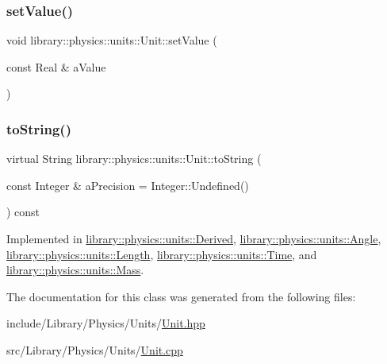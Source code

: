 \mbox{\label{classlibrary_1_1physics_1_1units_1_1_unit_a0d61125a36ae706eb4800564fb7c5e54}} 
\subsubsection{\texorpdfstring{set\+Value()}{setValue()}}
{\footnotesize\ttfamily void library\+::physics\+::units\+::\+Unit\+::set\+Value (\begin{DoxyParamCaption}\item[{const Real \&}]{a\+Value }\end{DoxyParamCaption})}

\mbox{\label{classlibrary_1_1physics_1_1units_1_1_unit_ad7364d457300e36413323c4aebce8029}} 
\subsubsection{\texorpdfstring{to\+String()}{toString()}}
{\footnotesize\ttfamily virtual String library\+::physics\+::units\+::\+Unit\+::to\+String (\begin{DoxyParamCaption}\item[{const Integer \&}]{a\+Precision = {\ttfamily Integer\+:\+:Undefined()} }\end{DoxyParamCaption}) const\hspace{0.3cm}{\ttfamily [pure virtual]}}



Implemented in \hyperlink{classlibrary_1_1physics_1_1units_1_1_derived_a3626d6c77e6753f44232067856fde9d1}{library\+::physics\+::units\+::\+Derived}, \hyperlink{classlibrary_1_1physics_1_1units_1_1_angle_aae6b7bd4e028ea7719f5a712ca19a86c}{library\+::physics\+::units\+::\+Angle}, \hyperlink{classlibrary_1_1physics_1_1units_1_1_length_aea1d96e6930f7e6e6383e78c55219a64}{library\+::physics\+::units\+::\+Length}, \hyperlink{classlibrary_1_1physics_1_1units_1_1_time_a6f56977493a45d334bb53bc4246888c4}{library\+::physics\+::units\+::\+Time}, and \hyperlink{classlibrary_1_1physics_1_1units_1_1_mass_a6e7757920752ac9f6918525d6fadb31e}{library\+::physics\+::units\+::\+Mass}.



The documentation for this class was generated from the following files\+:\begin{DoxyCompactItemize}
\item 
include/\+Library/\+Physics/\+Units/\hyperlink{_units_2_unit_8hpp}{Unit.\+hpp}\item 
src/\+Library/\+Physics/\+Units/\hyperlink{_units_2_unit_8cpp}{Unit.\+cpp}\end{DoxyCompactItemize}
